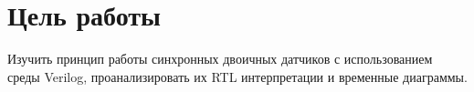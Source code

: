 

\section*{Цель работы}
Изучить принцип работы синхронных двоичных датчиков с использованием среды Verilog, проанализировать их RTL интерпретации и временные диаграммы.



